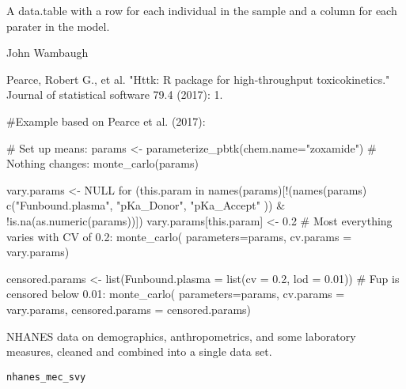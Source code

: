 \documentclass[a4paper]{book}
\begin{document}
%
\begin{Value}
A data.table with a row for each individual in the sample and a column for
each parater in the model.
\end{Value}
%
\begin{Author}\relax
John Wambaugh
\end{Author}
%
\begin{References}\relax
Pearce, Robert G., et al. "Httk: R package for high-throughput 
toxicokinetics." Journal of statistical software 79.4 (2017): 1.
\end{References}
%
\begin{Examples}
\begin{ExampleCode}

#Example based on Pearce et al. (2017):

# Set up means:
params <- parameterize_pbtk(chem.name="zoxamide")
# Nothing changes:
monte_carlo(params)

vary.params <- NULL
for (this.param in names(params)[!(names(params) %
  c("Funbound.plasma", "pKa_Donor", "pKa_Accept" )) &
  !is.na(as.numeric(params))]) vary.params[this.param] <- 0.2
# Most everything varies with CV of 0.2:
monte_carlo(
  parameters=params, 
  cv.params = vary.params)

censored.params <- list(Funbound.plasma = list(cv = 0.2, lod = 0.01))
# Fup is censored below 0.01:
monte_carlo(
  parameters=params, 
  cv.params = vary.params,
  censored.params = censored.params)

\end{ExampleCode}
\end{Examples}
%
\begin{Description}\relax
NHANES data on demographics, anthropometrics, and some laboratory measures,
cleaned and combined into a single data set.
\end{Description}
%
\begin{Usage}
\begin{verbatim}
nhanes_mec_svy
\end{verbatim}
\end{Usage}
%
\end{document}
